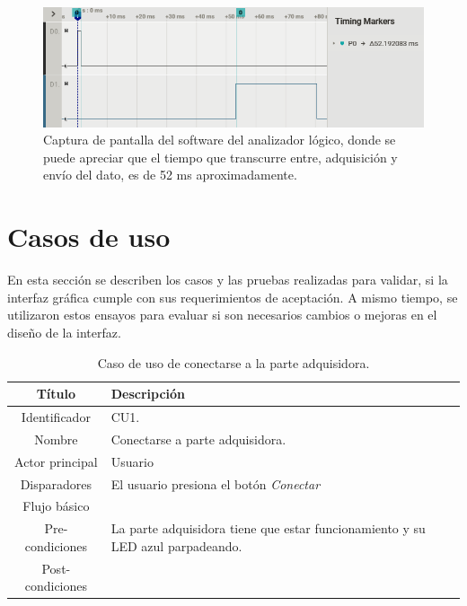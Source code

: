 \begin{figure}[htpb]
\centering
\includegraphics[width=\textwidth]{./Figures/tiempo-envio.png}
\caption{Captura de pantalla del software del analizador lógico, donde se puede apreciar que el tiempo que transcurre entre, adquisición y envío del dato, es de 52 ms aproximadamente.}
\label{fig:tiempo-envio}
\end{figure}

\break

\section{Casos de uso}

En esta sección se describen los casos y las pruebas realizadas para validar, si la interfaz gráfica cumple con sus requerimientos de aceptación. A mismo tiempo, se utilizaron estos ensayos para evaluar si son necesarios cambios o mejoras en el diseño de la interfaz.

\begin{table}[htpb]
	\centering
	\caption{Caso de uso de conectarse a la parte adquisidora.}
	\centering
	\begin{tabular}{c p{}}    
		\toprule
		\textbf{Título }     & \textbf{Descripción} \\
		\midrule
		Identificador		&  CU1. \\
		Nombre				&   Conectarse a parte adquisidora. \\
		Actor principal		&   Usuario \\
		Disparadores		&   El usuario presiona el botón \textit{Conectar} \\
		Flujo básico		&   \\
		Pre-condiciones		&   La parte adquisidora tiene que estar funcionamiento y su LED azul parpadeando. \\
		Post-condiciones	&    \\
		\bottomrule
	\end{tabular}
\label{tab:caso-conectar}
\end{table}

